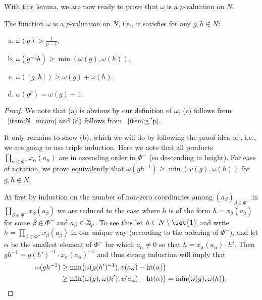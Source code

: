 With this lemma, we are now ready to prove that $\omega$ is a $p$-valuation on $N$.

\begin{proposition}\label{prop:N-p-val}
  The function $\omega$ is a $p$-valuation on $N$, i.e., it satisfies for any $g,h \in N$:
  \begin{enumerate}[(a)]
  \item $\omega(g) > \frac{1}{p-1}$,
  \item $\omega(g^{-1}h) \geq \min(\omega(g),\omega(h))$,
  \item $\omega([g,h]) \geq \omega(g) + \omega(h)$,
  \item $\omega(g^p) = \omega(g) + 1$.
  \end{enumerate}
\end{proposition}
\begin{proof}
  We note that (a) is obvious by our definition of $\omega$, (c) follows from ~\ref{item:N_mcom} and (d) follows from ~\ref{item:g^p}.

  It only remains to show (b), which we will do by following the proof idea of \cite[Lem.~1]{Zab}, i.e., we are going to use triple induction. Here we note that all products $\prod_{\alpha \in \Phi^{-}} x_\alpha(a_\alpha)$ are in ascending order in $\Phi^{-}$ (so descending in height). For ease of notation, we prove equivalently that $\omega(gh^{-1}) \geq \min(\omega(g),\omega(h))$ for $g,h \in N$.

  At first by induction on the number of non-zero coordinates among $(a_{\beta})_{\beta \in \Phi^{-}}$ in $\prod_{\beta \in \Phi^{-}} x_{\beta}(a_{\beta})$ we are reduced to the case where $h$ is of the form $h = x_{\beta}(a_{\beta})$ for some $\beta \in \Phi^{-}$ and $a_{\beta} \in \mathbb{Z}_p$. To see this let $h \in N \setminus \set{1}$ and write $h = \prod_{\beta \in \Phi^{-}} x_{\beta}(a_{\beta})$ in our unique way (according to the ordering of $\Phi^{-}$), and let $\alpha$ be the smallest element of $\Phi^{-}$ for which $a_{\alpha} \neq 0$ so that $h = x_{\alpha}(a_{\alpha}) \cdot h'$. Then $gh^{-1} = g(h')^{-1} \cdot x_{\alpha}(a_{\alpha})^{-1}$ and thus strong induction will imply that
\begin{align*}
  \omega(gh^{-1}) &\geq \min\bigl( \omega(g(h')^{-1}), v(a_{\alpha})-\operatorname{ht}(\alpha)\bigr) \\
  &\geq \min\bigl( \omega(g),\omega(h'), v(a_{\alpha})-\operatorname{ht}(\alpha) \bigr) = \min\bigl( \omega(g),\omega(h) \bigr).
\end{align*}


\end{proof}
